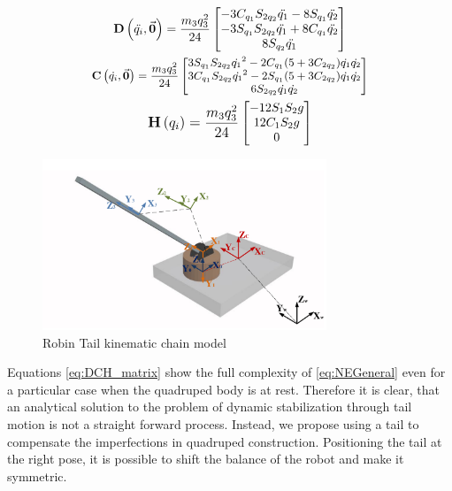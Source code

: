 \begin{gather}\label{eq:DCH_matrix}
\small
\mathbf{D}\left ( \ddot{q_i},\vec{\boldsymbol{0}} \right )=\frac{m_3 q_3^2}{24}\begin{bmatrix}
-3C_{q_1}S_{2q_2}\ddot{q_1} -8S_{q_1}\ddot{q_2}\\ -3S_{q_1}S_{2q_2}\ddot{q_1} +8C_{q_1}\ddot{q_2} \\ 8S_{q_2}\ddot{q_1}
\end{bmatrix} \\
\footnotesize
\mathbf{C}\left ( \dot{q_i},\vec{\boldsymbol{0}} \right )=\frac{m_3 q_3^2}{24} \begin{bmatrix}
3S_{q_1}S_{2q_2}{\dot{q_1}}^2-2C_{q_1}(5+3C_{2q_2})\dot{q_1}\dot{q_2}\\ 
3C_{q_1}S_{2q_2}{\dot{q_1}}^2-2S_{q_1}(5+3C_{2q_2})\dot{q_1}\dot{q_2}\\ 
6S_{2q_2}\dot{q_1}\dot{q_2}
\end{bmatrix}\\
\small
\mathbf{H}\left ( {q_i} \right )=\frac{m_3 q_3^2}{24} \begin{bmatrix}
-12S_1S_2g\\ 
12C_1S_2g\\ 
0
\end{bmatrix}
\normalsize
\end{gather}

\begin{figure}
	\centering
	\includegraphics[width=85mm]{./pictures/RobinRepic.pdf}
	\caption{Robin Tail kinematic chain model}
	\label{fig:rmax}
\end{figure}

Equations \eqref{eq:DCH_matrix} show the full complexity of \eqref{eq:NEGeneral} even for a particular case when the quadruped body is at rest. Therefore it is clear, that an analytical solution to the problem of dynamic stabilization through tail motion is not a straight forward process. Instead, we propose using a tail to compensate the imperfections in quadruped construction. Positioning the tail at the right pose, it is possible to shift the balance of the robot and make it symmetric. 
